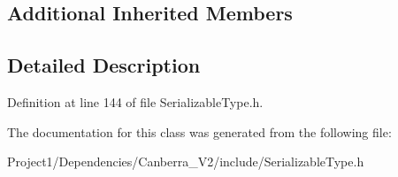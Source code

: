 \subsection*{Additional Inherited Members}


\subsection{Detailed Description}


Definition at line 144 of file Serializable\+Type.\+h.



The documentation for this class was generated from the following file\+:\begin{DoxyCompactItemize}
\item 
Project1/\+Dependencies/\+Canberra\+\_\+\+V2/include/Serializable\+Type.\+h\end{DoxyCompactItemize}
